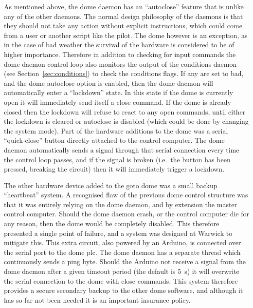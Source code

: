 \begin{colsection}
\begin{colsection}
As mentioned above, the dome daemon has an ``autoclose'' feature that is unlike any of the other daemons. The normal design philosophy of the daemons is that they should not take any action without explicit instructions, which could come from a user or another script like the pilot. The dome however is an exception, as in the case of bad weather the survival of the hardware is considered to be of higher importance. Therefore in addition to checking for input commands the dome daemon control loop also monitors the output of the conditions daemon (see Section~\ref{sec:conditions}) to check the conditions flags. If any are set to bad, and the dome autoclose option is enabled, then the dome daemon will automatically enter a ``lockdown'' state. In this state if the dome is currently open it will immediately send itself a close command. If the dome is already closed then the lockdown will refuse to react to any open commands, until either the lockdown is cleared or autoclose is disabled (which could be done by changing the system mode). Part of the hardware additions to the dome was a serial ``quick-close'' button directly attached to the control computer. The dome daemon automatically sends a signal through that serial connection every time the control loop passes, and if the signal is broken (i.e.\ the button has been pressed, breaking the circuit) then it will immediately trigger a lockdown.

The other hardware device added to the \gls{goto} dome was a small backup ``heartbeat'' system. A recognised flaw of the previous dome control structure was that it was entirely relying on the dome daemon, and by extension the master control computer. Should the dome daemon crash, or the control computer die for any reason, then the dome would be completely disabled. This therefore presented a single point of failure, and a system was designed at Warwick to mitigate this. This extra circuit, also powered by an Arduino, is connected over the serial port to the dome \gls{plc}. The dome daemon has a separate thread which continuously sends a ping byte. Should the Arduino not receive a signal from the dome daemon after a given timeout period (the default is \SI{5}{\second}) it will overwrite the serial connection to the dome with close commands. This system therefore provides a secure secondary backup to the other dome software, and although it has so far not been needed it is an important insurance policy.



\end{colsection}
\end{colsection}
